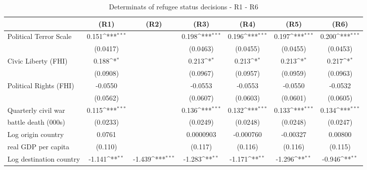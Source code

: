 \begin{table}[!ht]\centering \scriptsize
\def\sym#1{\ifmmode^{#1}\else\(^{#1}\)\fi}
\caption{Determinats of refugee status decisions - R1 - R6}
\begin{tabular}{l*{6}{c}}
\hline\hline
                    &\multicolumn{1}{c}{(R1)}&\multicolumn{1}{c}{(R2)}&\multicolumn{1}{c}{(R3)}&\multicolumn{1}{c}{(R4)}&\multicolumn{1}{c}{(R5)}&\multicolumn{1}{c}{(R6)}\\
\hline
Political Terror Scale&       0.151\sym{***}&                     &       0.198\sym{***}&       0.196\sym{***}&       0.197\sym{***}&       0.200\sym{***}\\
                    &    (0.0417)         &                     &    (0.0463)         &    (0.0455)         &    (0.0455)         &    (0.0453)         \\
[0,5em]
Civic Liberty (FHI) &       0.188\sym{*}  &                     &       0.213\sym{*}  &       0.213\sym{*}  &       0.213\sym{*}  &       0.217\sym{*}  \\
                    &    (0.0908)         &                     &    (0.0967)         &    (0.0957)         &    (0.0959)         &    (0.0963)         \\
[0,5em]
Political Rights (FHI)&     -0.0550         &                     &     -0.0553         &     -0.0553         &     -0.0550         &     -0.0532         \\
                    &    (0.0562)         &                     &    (0.0607)         &    (0.0603)         &    (0.0601)         &    (0.0605)         \\
[0,5em]
Quarterly civil war&       0.115\sym{***}&                     &       0.136\sym{***}&       0.132\sym{***}&       0.133\sym{***}&       0.134\sym{***}\\
 battle death (000s)                    &    (0.0233)         &                     &    (0.0249)         &    (0.0248)         &    (0.0248)         &    (0.0247)         \\
[0,5em]
Log origin country&      0.0761         &                     &   0.0000903         &   -0.000760         &    -0.00327         &     0.00800         \\
 real GDP per capita                    &     (0.110)         &                     &     (0.117)         &     (0.116)         &     (0.116)         &     (0.115)         \\
[0,5em]
Log destination country&      -1.141\sym{**} &      -1.439\sym{***}&      -1.283\sym{**} &      -1.171\sym{**} &      -1.296\sym{**} &      -0.946\sym{**} \\

\end{tabular}
\end{table}
